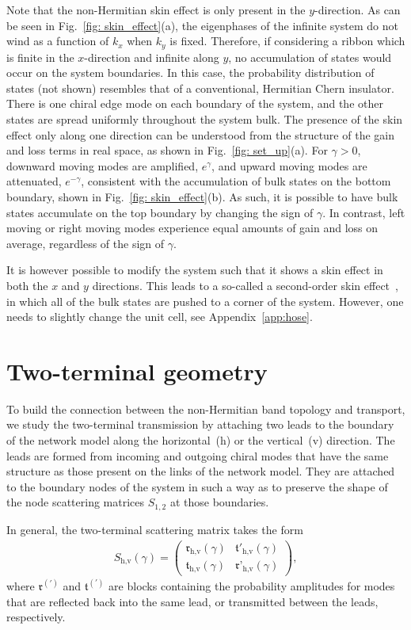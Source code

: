 \documentclass[aps,pra,reprint,superscriptaddress,showkeys,amsmath,amssymb,longbibliography]{revtex4-1}
\begin{document}
Note that the non-Hermitian skin effect is only present in the $y$-direction. 
As can be seen in  Fig.~\ref{fig: skin_effect}(a), the eigenphases of the infinite system do not wind as a function of $k_x$ when $k_y$ is fixed.
Therefore, if considering a ribbon which is finite in the $x$-direction and infinite along $y$, no accumulation of states would occur on the system boundaries.
In this case, the probability distribution of states (not shown) resembles that of a conventional, Hermitian Chern insulator. 
There is one chiral edge mode on each boundary of the system, and the other states are spread uniformly throughout the system bulk.
The presence of the skin effect only along one direction can be understood from the structure of the gain and loss terms in real space, as shown in Fig.~\ref{fig: set_up}(a).
For $\gamma>0$, downward moving modes are amplified, $e^\gamma$, and upward moving modes are attenuated, $e^{-\gamma}$, consistent with the accumulation of bulk states on the bottom boundary, shown in Fig.~\ref{fig: skin_effect}(b).
As such, it is possible to have bulk states accumulate on the top boundary by changing the sign of $\gamma$.
In contrast, left moving or right moving modes experience equal amounts of gain and loss on average, regardless of the sign of $\gamma$.

It is however possible to modify the system such that it shows a skin effect in both the $x$ and $y$ directions.
This leads to a so-called a second-order skin effect~\cite{Kawabata_prb2020}, in which all of the bulk states are pushed to a corner of the system. 
However, one needs to slightly change the unit cell, see Appendix~\ref{app:hose}.

\section{Two-terminal geometry}
\label{sec:ce}

To build the connection between the non-Hermitian band topology and transport, we study the two-terminal transmission by attaching two leads to the boundary of the network model along the horizontal~(h) or the vertical~(v) direction.
The leads are formed from incoming and outgoing chiral modes that have the same structure as those present on the links of the network model.
They are attached to the boundary nodes of the system in such a way as to preserve the shape of the node scattering matrices $S_{1,2}$ at those boundaries.

In general, the two-terminal scattering matrix takes the form
\begin{eqnarray}
S_{\text{h,v}}(\gamma)=\begin{pmatrix}
\mathfrak{r}_{\text{h,v}}(\gamma)&\mathfrak{t}'_{\text{h,v}}(\gamma)\\\mathfrak{t}_{\text{h,v}}(\gamma)&\mathfrak{r}’_{\text{h,v}}(\gamma)
\end{pmatrix},
\end{eqnarray}
where $\mathfrak{r}^{(\prime)}$ and $\mathfrak{t}^{(\prime)}$ are blocks containing the probability amplitudes for modes that are reflected back into the same lead, or transmitted between the leads, respectively.
\end{document}
